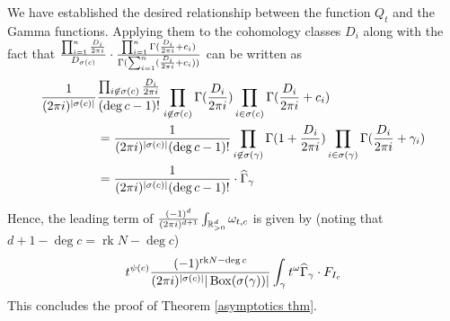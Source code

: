 \documentclass[11pt,reqno]{amsart}
\def\rk {{\operatorname{rk}}}
\theoremstyle{definition}
\numberwithin{equation}{section}
\begin{document}
We have established the desired relationship between the function $Q_t$ and the Gamma functions. Applying them to the cohomology classes $D_i$ along with the fact that $\frac{\prod_{i=1}^n \frac{D_i}{2\pi{\rm i}}}{D_{\sigma(c)}}\cdot\frac{\prod_{i=1}^n\Gamma(\frac{D_i}{2\pi{\rm i}}+c_i)}{\Gamma(\sum_{i=1}^n(\frac{D_i}{2\pi{\rm i}}+c_i))}$ can be written as
\begin{align*}
	\frac{1}{(2\pi {\rm i})^{|\sigma(c)|}}&\frac{\prod_{i\not\in\sigma(c)}\frac{D_i}{2\pi{\rm i}}}{(\deg c-1)!}\prod_{i\not\in\sigma(c)}\Gamma(\frac{D_i}{2\pi{\rm i}})\prod_{i\in\sigma(c)}\Gamma(\frac{D_i}{2\pi{\rm i}}+c_i)\\
	&=\frac{1}{(2\pi {\rm i})^{|\sigma(c)|}(\deg c-1)!}\prod_{i\not\in\sigma(\gamma)}\Gamma(1+\frac{D_i}{2\pi{\rm i}})\prod_{i\in\sigma(\gamma)}\Gamma(\frac{D_i}{2\pi{\rm i}}+\gamma_i)\\
	&=\frac{1}{(2\pi {\rm i})^{|\sigma(c)|}(\deg c-1)!}\cdot\widehat{\Gamma}_{\gamma}
\end{align*}

Hence, the leading term of $\frac{(-1)^{d}}{(2\pi{\rm i})^{d+1}}\int_{\mathbb{R}_{>0}^d}\omega_{t,c}$ is given by (noting that $d+1-\deg c=\rk N-\deg c$)
\begin{align*}
		t^{\psi(c)} \frac{(-1)^{\rk N-\deg c}}{(2\pi {\rm i})^{|\sigma(c)|}|\operatorname{Box}(\sigma(\gamma))|}\int_{\gamma}t^{\omega}\widehat{\Gamma}_{\gamma}\cdot F_{I_c}
\end{align*}
This concludes the proof of Theorem \ref{asymptotics thm}.
\end{document}
